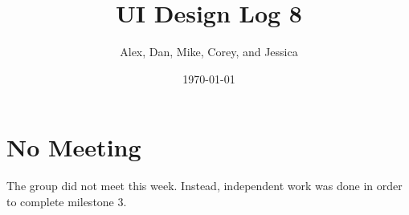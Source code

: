 \documentclass{article}
\title{UI Design Log 8}
\author{Alex, Dan, Mike, Corey, and Jessica}
\date{\today}
\begin{document}
\maketitle
\section{No Meeting}
The group did not meet this week.
Instead, independent work was done in order to complete milestone 3.
\end{document}
